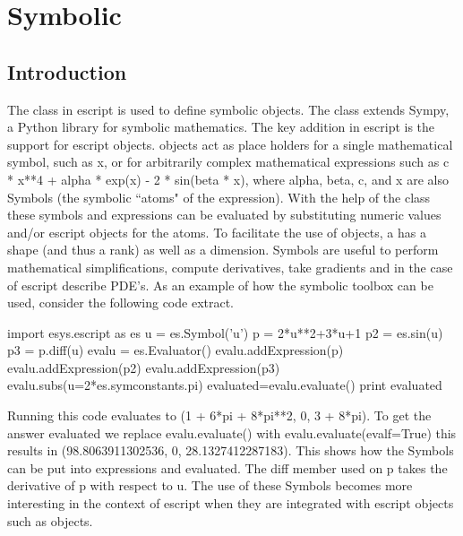 \chapter{Symbolic}
\label{CHAP: Symbolic}
\section{Introduction}
The \SYMBOL class in escript is used to define symbolic objects. The class extends Sympy\cite{Sympy}, a Python library for symbolic mathematics. The key 
addition in escript is the support for escript objects. \SYMBOL objects act as place holders for a single mathematical symbol, 
such as x, or for arbitrarily complex mathematical expressions such as
c * x**4 + alpha * exp(x) - 2 * sin(beta * x), where alpha, beta, c, and x
are also Symbols (the symbolic ``atoms" of the expression).
With the help of the \EVALUATOR class these symbols and expressions can
be evaluated by substituting numeric values and/or escript \Data objects
for the atoms. To facilitate the use of \Data objects, a \SYMBOL has a
shape (and thus a rank) as well as a dimension.
Symbols are useful to perform mathematical simplifications,
compute derivatives, take gradients and in the case of escript describe PDE's. As an example of how the symbolic toolbox can be used, consider the following code extract.
\begin{python}
import esys.escript as es
u = es.Symbol('u')
p = 2*u**2+3*u+1
p2 = es.sin(u)
p3 = p.diff(u)
evalu = es.Evaluator()
evalu.addExpression(p)
evalu.addExpression(p2)
evalu.addExpression(p3)
evalu.subs(u=2*es.symconstants.pi)
evaluated=evalu.evaluate()
print evaluated
\end{python}
Running this code evaluates to (1 + 6*pi + 8*pi**2, 0, 3 + 8*pi).  To get the answer evaluated we replace evalu.evaluate() with evalu.evaluate(evalf=True) this results in (98.8063911302536, 0, 28.1327412287183). This shows how the Symbols can be put into expressions and evaluated. The diff member used on p takes the derivative of p with respect to u. The use of these Symbols becomes more interesting in the context of escript when they are integrated with escript objects such as \Data objects. 
